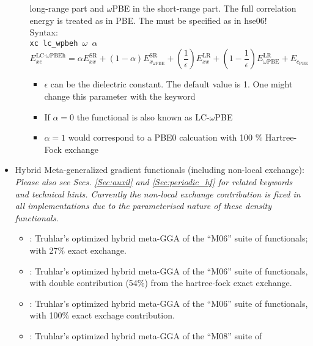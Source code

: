 \begin{itemize}
\begin{itemize}
long-range part
        and $\omega$PBE \cite{Vydrov06} in the short-range part. The full correlation energy is treated as in PBE. 
        The  must be specified as in hse06!\\
        Syntax: \\
        \texttt{xc lc\_wpbeh $\omega$ $\alpha$}\\
        \begin{equation}
         E_{xc}^{\text{LC-}\omega\text{PBEh}} = \alpha E_{xx}^{\text{SR}} + (1-\alpha) E_{x_{\omega\text{PBE}}}^{\text{SR}} + 
         \left( \frac{1}{\epsilon} \right) E_{xx}^{\text{LR}} + \left( 1-\frac{1}{\epsilon} \right) 
E_{\omega\text{PBE}}^{\text{LR}} + E_{c_{\text{PBE}}}
        \end{equation}
        \begin{itemize}
         \item $\epsilon$ can be the dielectric constant. The default value is 1. One might change this parameter with the 
               keyword 
         \item If $\alpha = 0$ the functional is also known as LC-$\omega$PBE \cite{Gallandi2015}
         \item $\alpha = 1$ would correspond to a PBE0 calcuation with 100 \% Hartree-Fock exchange
        \end{itemize}
    \end{itemize}
 \item Hybrid Meta-generalized gradient functionals (including non-local exchange): 
     \emph{Please also see Secs. \ref{Sec:auxil} and \ref{Sec:periodic_hf} for related keywords and technical hints.
     Currently the non-local exchange contribution is fixed in all implementations due to the parameterised nature
     of these density functionals.}
    \begin{itemize}
  \item {} : Truhlar's optimized hybrid meta-GGA of the ``M06'' suite of
    functionals; with 27\% exact exchange. \cite{ZhaoTruhlar06_M06_M06-2X}
  \item {} : Truhlar's optimized hybrid meta-GGA of the ``M06'' suite of
    functionals, with double contribution (54\%) from the hartree-fock exact exchange. \cite{ZhaoTruhlar06_M06_M06-2X}
  \item {} : Truhlar's optimized hybrid meta-GGA of the ``M06'' suite of
    functionals, with 100\% exact exchage contribution. \cite{ZhaoTruhlar06_M06-HF}
  \item {} : Truhlar's optimized hybrid meta-GGA of the ``M08'' suite of

\end{itemize}
\end{itemize}
